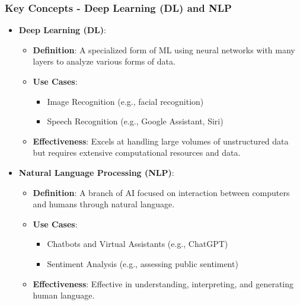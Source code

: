 \documentclass{beamer}
\begin{document}
\begin{frame}[fragile]
    \frametitle{Key Concepts - Deep Learning (DL) and NLP}
    \begin{itemize}
        \item \textbf{Deep Learning (DL)}:
        \begin{itemize}
            \item \textbf{Definition}: A specialized form of ML using 
            neural networks with many layers to analyze various forms of data.
            \item \textbf{Use Cases}:
            \begin{itemize}
                \item Image Recognition (e.g., facial recognition)
                \item Speech Recognition (e.g., Google Assistant, Siri)
            \end{itemize}
            \item \textbf{Effectiveness}:
            Excels at handling large volumes of unstructured data 
            but requires extensive computational resources and data.
        \end{itemize}

        \item \textbf{Natural Language Processing (NLP)}:
        \begin{itemize}
            \item \textbf{Definition}: A branch of AI focused on 
            interaction between computers and humans through natural language.
            \item \textbf{Use Cases}:
            \begin{itemize}
                \item Chatbots and Virtual Assistants (e.g., ChatGPT)
                \item Sentiment Analysis (e.g., assessing public sentiment)
            \end{itemize}
            \item \textbf{Effectiveness}:
            Effective in understanding, interpreting, and generating human language.
        \end{itemize}
    \end{itemize}
\end{frame}
\end{document}
